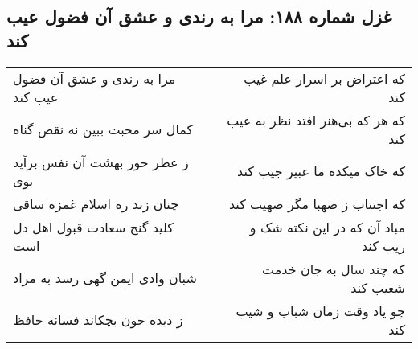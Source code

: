 \begin{center}
\section*{غزل شماره ۱۸۸: مرا به رندی و عشق آن فضول عیب کند}
\label{sec:sh188}
\begin{longtable}{l p{0.5cm} r}
مرا به رندی و عشق آن فضول عیب کند
&&
که اعتراض بر اسرار علم غیب کند
\\
کمال سر محبت ببین نه نقص گناه
&&
که هر که بی‌هنر افتد نظر به عیب کند
\\
ز عطر حور بهشت آن نفس برآید بوی
&&
که خاک میکده ما عبیر جیب کند
\\
چنان زند ره اسلام غمزه ساقی
&&
که اجتناب ز صهبا مگر صهیب کند
\\
کلید گنج سعادت قبول اهل دل است
&&
مباد آن که در این نکته شک و ریب کند
\\
شبان وادی ایمن گهی رسد به مراد
&&
که چند سال به جان خدمت شعیب کند
\\
ز دیده خون بچکاند فسانه حافظ
&&
چو یاد وقت زمان شباب و شیب کند
\\
\end{longtable}
\end{center}
